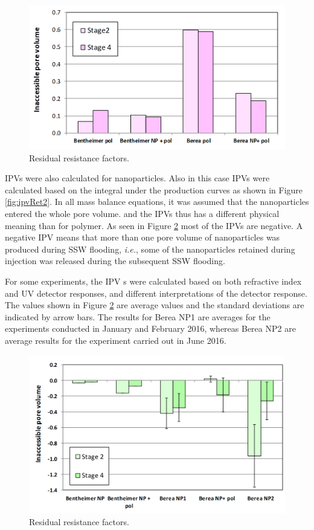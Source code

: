 \begin{figure}[p]
    \centering
    \includegraphics[width=\textwidth]{img/cht/ipvPol.png}
    \caption{Residual resistance factors.}
    \label{cht:ipvPol}
\end{figure}

IPVs were also calculated for nanoparticles. Also in this case IPVs were calculated based on the integral under the production curves as shown in Figure \ref{fig:ipvRet2}. In all mass balance equations, it was assumed that the nanoparticles entered the whole pore volume. and the IPVs thus has a different physical meaning than for polymer. As seen in Figure \ref{cht:ipvNP} most of the IPVs are negative. A negative IPV means that more than one pore volume of nanoparticles was produced during SSW flooding, \textit{i.e.}, some of the nanoparticles retained during injection was released during the subsequent SSW flooding.

For some experiments, the IPV s were calculated based on both refractive index and UV detector responses, and different interpretations of the detector response. The values shown in Figure \ref{cht:ipvNP} are average values and the standard deviations are indicated by arrow bars. The results for Berea NP1 are averages for the experiments conducted in January and February 2016, whereas Berea NP2 are average results for the experiment carried out in June 2016.

\begin{figure}[p]
    \centering
    \includegraphics[width=\textwidth]{img/cht/ipvNP.png}
    \caption{Residual resistance factors.}
    \label{cht:ipvNP} %
\end{figure}

